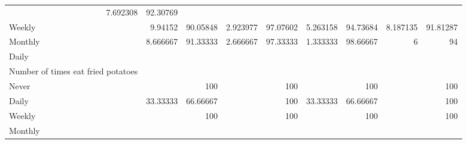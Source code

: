 \documentclass{article}
\begin{document}
\begin{tabular}{lllllllll}
  \multicolumn{1}{r}{7.692308} &
  \multicolumn{1}{r}{92.30769} \\
\multicolumn{1}{l}{\hspace{7em}Weekly} &
  \multicolumn{1}{|r}{9.94152} &
  \multicolumn{1}{r}{90.05848} &
  \multicolumn{1}{r}{2.923977} &
  \multicolumn{1}{r}{97.07602} &
  \multicolumn{1}{r}{5.263158} &
  \multicolumn{1}{r}{94.73684} &
  \multicolumn{1}{r}{8.187135} &
  \multicolumn{1}{r}{91.81287} \\
\multicolumn{1}{l}{\hspace{7em}Monthly} &
  \multicolumn{1}{|r}{8.666667} &
  \multicolumn{1}{r}{91.33333} &
  \multicolumn{1}{r}{2.666667} &
  \multicolumn{1}{r}{97.33333} &
  \multicolumn{1}{r}{1.333333} &
  \multicolumn{1}{r}{98.66667} &
  \multicolumn{1}{r}{6} &
  \multicolumn{1}{r}{94} \\
\multicolumn{1}{l}{\hspace{5em}Daily} &
  \multicolumn{1}{|r}{} &
  \multicolumn{1}{r}{} &
  \multicolumn{1}{r}{} &
  \multicolumn{1}{r}{} &
  \multicolumn{1}{r}{} &
  \multicolumn{1}{r}{} &
  \multicolumn{1}{r}{} &
  \multicolumn{1}{r}{} \\
\multicolumn{1}{l}{\hspace{6em}Number of times eat fried potatoes} &
  \multicolumn{1}{|r}{} &
  \multicolumn{1}{r}{} &
  \multicolumn{1}{r}{} &
  \multicolumn{1}{r}{} &
  \multicolumn{1}{r}{} &
  \multicolumn{1}{r}{} &
  \multicolumn{1}{r}{} &
  \multicolumn{1}{r}{} \\
\multicolumn{1}{l}{\hspace{7em}Never} &
  \multicolumn{1}{|r}{} &
  \multicolumn{1}{r}{100} &
  \multicolumn{1}{r}{} &
  \multicolumn{1}{r}{100} &
  \multicolumn{1}{r}{} &
  \multicolumn{1}{r}{100} &
  \multicolumn{1}{r}{} &
  \multicolumn{1}{r}{100} \\
\multicolumn{1}{l}{\hspace{7em}Daily} &
  \multicolumn{1}{|r}{33.33333} &
  \multicolumn{1}{r}{66.66667} &
  \multicolumn{1}{r}{} &
  \multicolumn{1}{r}{100} &
  \multicolumn{1}{r}{33.33333} &
  \multicolumn{1}{r}{66.66667} &
  \multicolumn{1}{r}{} &
  \multicolumn{1}{r}{100} \\
\multicolumn{1}{l}{\hspace{7em}Weekly} &
  \multicolumn{1}{|r}{} &
  \multicolumn{1}{r}{100} &
  \multicolumn{1}{r}{} &
  \multicolumn{1}{r}{100} &
  \multicolumn{1}{r}{} &
  \multicolumn{1}{r}{100} &
  \multicolumn{1}{r}{} &
  \multicolumn{1}{r}{100} \\
\multicolumn{1}{l}{\hspace{7em}Monthly} &

\end{tabular}
\end{document}
